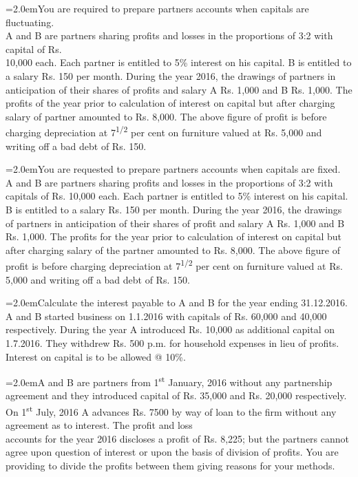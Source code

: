 \documentclass[11pt,a4paper]{article}
\newcommand{\lqn}[2]{\Needspace{6\baselineskip}\par\medskip\noindent\hangindent=2.0em\hangafter=1\makebox[2.0em][l]{\textbf{#1.}}#2\par}
\begin{document}
\lqn{78}{You are required to prepare partners accounts when capitals are fluctuating.\\
A and B are partners sharing profits and losses in the proportions of 3:2 with capital of Rs.\\
10,000 each. Each partner is entitled to 5\% interest on his capital. B is entitled to a salary Rs. 150 per month. During the year 2016, the drawings of partners in anticipation of their shares of profits and salary A Rs. 1,000 and B Rs. 1,000. The profits of the year prior to calculation of interest on capital but after charging salary of partner amounted to Rs. 8,000. The above figure of profit is before charging depreciation at 7\textsuperscript{1/2} per cent on furniture valued at Rs. 5,000 and writing off a bad debt of Rs. 150.\par
}
\lqn{79}{You are requested to prepare partners accounts when capitals are fixed.\\
A and B are partners sharing profits and losses in the proportions of 3:2 with capitals of Rs. 10,000 each. Each partner is entitled to 5\% interest on his capital. B is entitled to a salary Rs. 150 per month. During the year 2016, the drawings of partners in anticipation of their shares of profit and salary A Rs. 1,000 and B Rs. 1,000. The profits for the year prior to calculation of interest on capital but after charging salary of the partner amounted to Rs. 8,000. The above figure of profit is before charging depreciation at 7\textsuperscript{1/2} per cent on furniture valued at Rs. 5,000 and writing off a bad debt of Rs. 150.\par
}
\lqn{80}{Calculate the interest payable to A and B for the year ending 31.12.2016.\\
A and B started business on 1.1.2016 with capitals of Rs. 60,000 and 40,000 respectively. During the year A introduced Rs. 10,000 as additional capital on 1.7.2016. They withdrew Rs. 500 p.m. for household expenses in lieu of profits. Interest on capital is to be allowed @ 10\%.\par
}
\lqn{81}{A and B are partners from 1\textsuperscript{st}  January, 2016 without any partnership agreement and they introduced capital of Rs. 35,000 and Rs. 20,000 respectively.  On 1\textsuperscript{st}  July, 2016 A advances Rs. 7500 by way of loan to the firm without any agreement as to interest. The profit and loss\\
accounts for the year 2016 discloses a profit of Rs. 8,225; but the partners cannot agree upon question of interest or upon the basis of division of profits. You are providing to divide the profits between them giving reasons for your methods.\par
}
\end{document}
